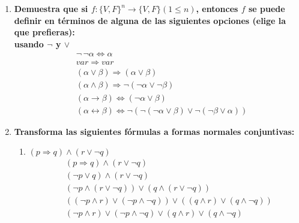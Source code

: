 \documentclass[10pt,letterpaper,fleqn]{article}
\begin{document}
    \begin{enumerate}
    
        \item \textbf{ Demuestra que si $f : \{V, F\}^n \rightarrow \{V, F\} (1 \leq n)$, entonces $f$ se puede definir en términos de
        alguna de las siguientes opciones (elige la que prefieras):}
        \\\textbf{usando $\neg  $  y $\vee $ }
        \begin{equation*}
            \begin{split}
                & \neg \,\neg \alpha \Leftrightarrow \alpha
                \\& var \Rightarrow var
                \\& (\alpha \vee \beta) \Rightarrow (\alpha \vee \beta)
                \\& (\alpha \wedge \beta) \Rightarrow \neg(\neg \alpha \vee \neg \beta)
                \\& (\alpha \rightarrow \beta) \Leftrightarrow (\neg \alpha \vee \beta)
                \\& (\alpha \leftrightarrow \beta) \Leftrightarrow \neg(\neg(\neg \alpha \vee \beta )\vee \neg(\neg \beta \vee   \alpha))
            \end{split}
        \end{equation*}
		
        \item \textbf{Transforma las siguientes fórmulas a formas normales conjuntivas:}
        \begin{enumerate}
            \item \textbf{ $(p \Rightarrow q) \wedge (r \vee \neg q) $}
            \begin{equation*}
                \begin{split}
                    &   (p \Rightarrow q) \wedge (r \vee \neg q)
                    \\& (\neg p \vee  q) \wedge (r \vee \neg q)
                    \\& (\neg p \wedge  (r \vee \neg q)  ) \vee (q \wedge  (r \vee \neg q)  )
                    \\& ((\neg p \wedge r) \vee (\neg p \wedge \neg q)) \vee ((q \wedge r) \vee (q \wedge \neg q))
                    \\& (\neg p \wedge r) \vee (\neg p \wedge \neg q) \vee  (q \wedge r) \vee (q \wedge \neg q)
                \end{split}
            \end{equation*}
            

\end{enumerate}
\end{enumerate}
\end{document}

